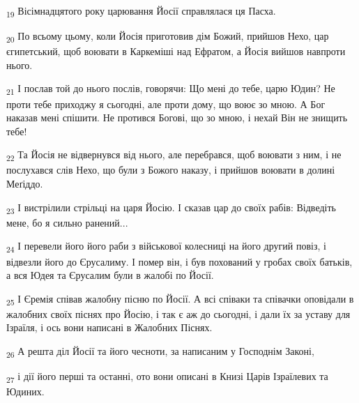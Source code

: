\begin{tcolorbox}
\textsubscript{19} Вісімнадцятого року царювання Йосії справлялася ця Пасха.
\end{tcolorbox}
\begin{tcolorbox}
\textsubscript{20} По всьому цьому, коли Йосія приготовив дім Божий, прийшов Нехо, цар єгипетський, щоб воювати в Каркеміші над Ефратом, а Йосія вийшов навпроти нього.
\end{tcolorbox}
\begin{tcolorbox}
\textsubscript{21} І послав той до нього послів, говорячи: Що мені до тебе, царю Юдин? Не проти тебе приходжу я сьогодні, але проти дому, що воює зо мною. А Бог наказав мені спішити. Не протився Богові, що зо мною, і нехай Він не знищить тебе!
\end{tcolorbox}
\begin{tcolorbox}
\textsubscript{22} Та Йосія не відвернувся від нього, але перебрався, щоб воювати з ним, і не послухався слів Нехо, що були з Божого наказу, і прийшов воювати в долині Меґіддо.
\end{tcolorbox}
\begin{tcolorbox}
\textsubscript{23} І вистрілили стрільці на царя Йосію. І сказав цар до своїх рабів: Відведіть мене, бо я сильно ранений...
\end{tcolorbox}
\begin{tcolorbox}
\textsubscript{24} І перевели його його раби з військової колесниці на його другий повіз, і відвезли його до Єрусалиму. І помер він, і був похований у гробах своїх батьків, а вся Юдея та Єрусалим були в жалобі по Йосії.
\end{tcolorbox}
\begin{tcolorbox}
\textsubscript{25} І Єремія співав жалобну пісню по Йосії. А всі співаки та співачки оповідали в жалобних своїх піснях про Йосію, і так є аж до сьогодні, і дали їх за уставу для Ізраїля, і ось вони написані в Жалобних Піснях.
\end{tcolorbox}
\begin{tcolorbox}
\textsubscript{26} А решта діл Йосії та його чесноти, за написаним у Господнім Законі,
\end{tcolorbox}
\begin{tcolorbox}
\textsubscript{27} і дії його перші та останні, ото вони описані в Книзі Царів Ізраїлевих та Юдиних.
\end{tcolorbox}
